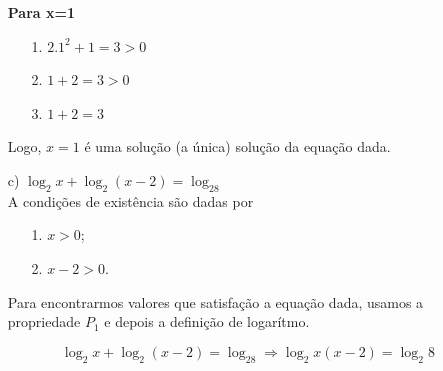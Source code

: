 \begin{exe}
\begin{itemize}
 \textbf{Para x=1}
 \begin{enumerate}
 \item[1.] $2.1^2+1=3 >0$
    \item[2.] $1+2=3>0$
    \item[3.] $1+2=3$
    \end{enumerate}
     Logo, $x=1$ é uma solução (a única) solução da equação dada.
    \color{black}
    \item[c)] $\log_2x+ \log_2(x-2)= \log_28$ \\
    \color{red}
    A condições de existência são dadas por
    \begin{enumerate}
        \item[1.] $x>0$;
        \item[2.] $x-2>0$.
    \end{enumerate}
Para encontrarmos valores que satisfação a equação dada, usamos a propriedade $P_1$ e depois a definição de logarítmo.

\[\log_2x+ \log_2(x-2)= \log_28 \Longrightarrow \log_2x(x-2)= \log_{2}8 \]


\end{itemize}
\end{exe}
